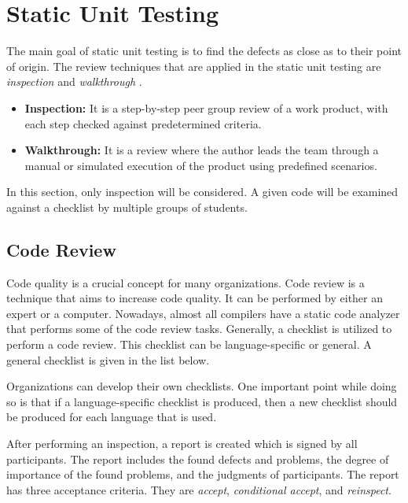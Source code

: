 \chapter{Static Unit Testing}
The main goal of static unit testing is to find the defects as close as to their point of origin. The review techniques that are applied in the static unit testing are \emph{inspection} and \emph{walkthrough} \autocite{naik2011software}.
\begin{itemize}
    \item \textbf{Inspection:} It is a step-by-step peer group review of a work product, with each step checked against predetermined criteria.
    \item \textbf{Walkthrough:} It is a review where the author leads the team through a manual or simulated execution of the product using predefined scenarios.
\end{itemize}
In this section, only inspection will be considered. A given code will be examined against a checklist by multiple groups of students.

\section{Code Review}
Code quality is a crucial concept for many organizations. Code review is a technique that aims to increase code quality. It can be performed by either an expert or a computer. Nowadays, almost all compilers have a static code analyzer that performs some of the code review tasks. Generally, a checklist is utilized to perform a code review. This checklist can be language-specific or general. A general checklist is given in the list below.

Organizations can develop their own checklists. One important point while doing so is that if a language-specific checklist is produced, then a new checklist should be produced for each language that is used.

After performing an inspection, a report is created which is signed by all participants. The report includes the found defects and problems, the degree of importance of the found problems, and the judgments of participants. The report has three acceptance criteria. They are \emph{accept}, \emph{conditional accept}, and \emph{reinspect}.

